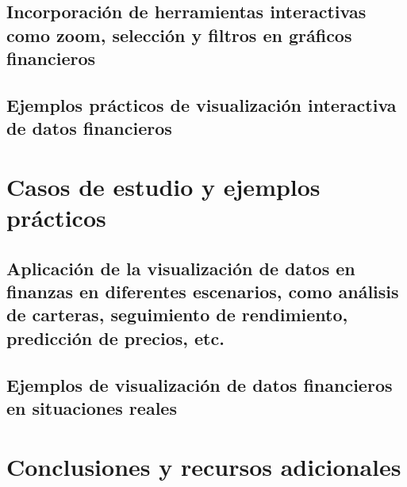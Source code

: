 \documentclass[
  a4paper,
]{article}
\begin{document}
\hypertarget{incorporaciuxf3n-de-herramientas-interactivas-como-zoom-selecciuxf3n-y-filtros-en-gruxe1ficos-financieros}{%
\subsection{Incorporación de herramientas interactivas como zoom,
selección y filtros en gráficos
financieros}\label{incorporaciuxf3n-de-herramientas-interactivas-como-zoom-selecciuxf3n-y-filtros-en-gruxe1ficos-financieros}}

\hypertarget{ejemplos-pruxe1cticos-de-visualizaciuxf3n-interactiva-de-datos-financieros}{%
\subsection{Ejemplos prácticos de visualización interactiva de datos
financieros}\label{ejemplos-pruxe1cticos-de-visualizaciuxf3n-interactiva-de-datos-financieros}}

\hypertarget{casos-de-estudio-y-ejemplos-pruxe1cticos}{%
\section{Casos de estudio y ejemplos
prácticos}\label{casos-de-estudio-y-ejemplos-pruxe1cticos}}

\hypertarget{aplicaciuxf3n-de-la-visualizaciuxf3n-de-datos-en-finanzas-en-diferentes-escenarios-como-anuxe1lisis-de-carteras-seguimiento-de-rendimiento-predicciuxf3n-de-precios-etc.}{%
\subsection{Aplicación de la visualización de datos en finanzas en
diferentes escenarios, como análisis de carteras, seguimiento de
rendimiento, predicción de precios,
etc.}\label{aplicaciuxf3n-de-la-visualizaciuxf3n-de-datos-en-finanzas-en-diferentes-escenarios-como-anuxe1lisis-de-carteras-seguimiento-de-rendimiento-predicciuxf3n-de-precios-etc.}}

\hypertarget{ejemplos-de-visualizaciuxf3n-de-datos-financieros-en-situaciones-reales}{%
\subsection{Ejemplos de visualización de datos financieros en
situaciones
reales}\label{ejemplos-de-visualizaciuxf3n-de-datos-financieros-en-situaciones-reales}}

\hypertarget{conclusiones-y-recursos-adicionales}{%
\section{Conclusiones y recursos
adicionales}\label{conclusiones-y-recursos-adicionales}}
\end{document}
